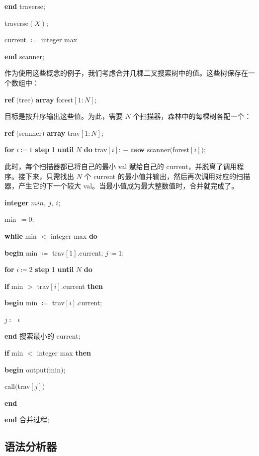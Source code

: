 \documentclass[twoside,11pt,fontset=none]{ctexbook}
\begin{document}
\quad \quad \quad \quad \quad \textbf{end} traverse;

\quad \quad \quad traverse$(X)$;

\quad \quad \quad current $\coloneq$ integer max

\quad \quad \textbf{end} scanner;

作为使用这些概念的例子，我们考虑合并几棵二叉搜索树中的值。这些树保存在一个数组中：

\quad \textbf{ref} $($tree$)$ \textbf{array} forest$[1: N]$;

\noindent
目标是按升序输出这些值。为此，需要 $N$ 个扫描器，森林中的每棵树各配一个：

\quad \textbf{ref} $($scanner$)$ \textbf{array} trav$[1: N]$;

\quad \textbf{for} $i\coloneq 1$ \textbf{step} 1 \textbf{until} $N$ \textbf{do} trav$[i]$: $-$ \textbf{new} scanner$($forest$[i]);$

\noindent
此时，每个扫描器都已将自己的最小 val 赋给自己的 current，并脱离了调用程序。接下来，只需找出 $N$ 个 current 的最小值并输出，然后再次调用对应的扫描器，产生它的下一个较大 val。当最小值成为最大整数值时，合并就完成了。

\quad \textbf{integer} $min,\ j,\ i$;

\quad min $\coloneq 0$;

\quad \textbf{while} min $<$ integer max \textbf{do}

\quad \quad \textbf{begin} min $\coloneq$ trav$[1]$.current; $j\coloneq 1$;

\quad \quad \quad \textbf{for} $i\coloneq 2$ \textbf{step} 1 \textbf{until} $N$ \textbf{do}

\quad \quad \quad \quad \textbf{if} min $>$ trav$[i]$.current \textbf{then}

\quad \quad \quad \quad \quad \textbf{begin} min $\coloneq$ trav$[i]$.current;

\quad \quad \quad \quad \quad \quad $j\coloneq i$

\quad \quad \quad \quad \quad \textbf{end} 搜索最小的 current;

\quad \quad \quad \textbf{if} min $<$ integer max \textbf{then}

\quad \quad \quad \quad \textbf{begin} output$($min$)$;

\quad \quad \quad \quad \quad call$($trav$[j])$

\quad \quad \quad \quad \textbf{end}

\quad \quad \textbf{end} 合并过程;

\subsection{语法分析器}
\end{document}
